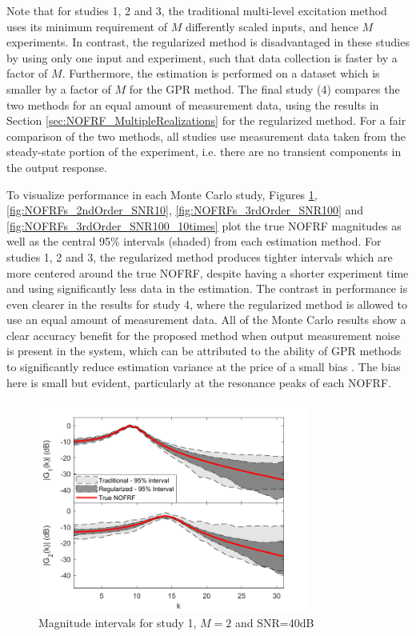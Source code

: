 Note that for studies 1, 2 and 3, the traditional multi-level excitation method uses its minimum requirement of $M$ differently scaled inputs, and hence $M$ experiments. In contrast, the regularized method is disadvantaged in these studies by using only one input and experiment, such that data collection is faster by a factor of $M$. Furthermore, the estimation is performed on a dataset which is smaller by a factor of $M$ for the GPR method. The final study (4) compares the two methods for an equal amount of measurement data, using the results in Section \ref{sec:NOFRF_MultipleRealizations} for the regularized method. For a fair comparison of the two methods, all studies use measurement data taken from the steady-state portion of the experiment, i.e. there are no transient components in the output response. 

To visualize performance in each Monte Carlo study, Figures \ref{fig:NOFRFs_2ndOrder_SNR100}, \ref{fig:NOFRFs_2ndOrder_SNR10}, \ref{fig:NOFRFs_3rdOrder_SNR100} and \ref{fig:NOFRFs_3rdOrder_SNR100_10times} plot the true NOFRF magnitudes as well as the central 95\% intervals (shaded) from each estimation method. For studies 1, 2 and 3, the regularized method produces tighter intervals which are more centered around the true NOFRF, despite having a shorter experiment time and using significantly less data in the estimation. The contrast in performance is even clearer in the results for study 4, where the regularized method is allowed to use an equal amount of measurement data. All of the Monte Carlo results show a clear accuracy benefit for the proposed method when output measurement noise is present in the system, which can be attributed to the ability of GPR methods to significantly reduce estimation variance at the price of a small bias \citep{Pillonetto2014}. The bias here is small but evident, particularly at the resonance peaks of each NOFRF.

\begin{figure}[!hp]
\centering
\includegraphics[width=0.8\textwidth]{Chapter7_NOFRFs/Hamm2ndOrder_SNR100_N128_DiscreteTime.pdf}
\caption{Magnitude intervals for study 1, $M=2$ and SNR=40dB}
\label{fig:NOFRFs_2ndOrder_SNR100}
\end{figure}

